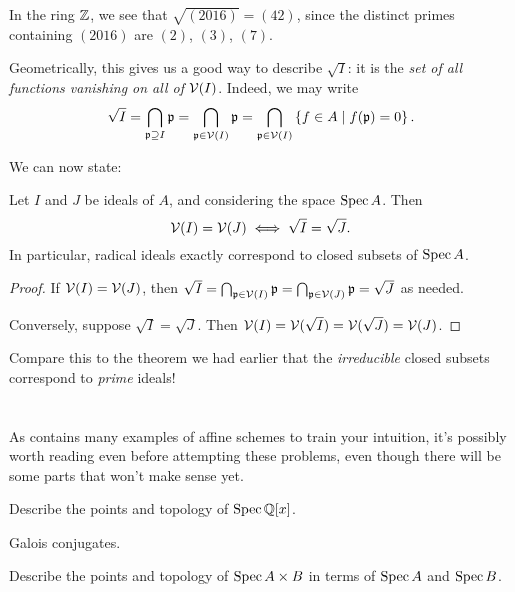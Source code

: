 \begin{example}
	[$\sqrt{(2016)} = (42)$ in $\ZZ$]
	In the ring $\ZZ$, we see that $\sqrt{(2016)} = (42)$,
	since the distinct primes containing $(2016)$
	are $(2)$, $(3)$, $(7)$.
\end{example}

Geometrically, this gives us a good way to describe $\sqrt I$:
it is the \emph{set of all functions vanishing on all of $\mathcal V(I)$}.
Indeed, we may write
\[ \sqrt I = \bigcap_{\mathfrak p \supseteq I} \mathfrak p
	= \bigcap_{\mathfrak p \in \mathcal V(I)} \mathfrak p
	= \bigcap_{\mathfrak p \in \mathcal V(I)} \left\{ f \in A \mid f(\mathfrak p) = 0 \right\}. \]

We can now state:
\begin{theorem}
	Let $I$ and $J$ be ideals of $A$,
	and considering the space $\operatorname{Spec} A$.
	Then
	\[ \mathcal V(I) = \mathcal V(J) \iff \sqrt I = \sqrt J. \]
	In particular, radical ideals exactly
	correspond to closed subsets of $\operatorname{Spec} A$.
\end{theorem}
\begin{proof}
	If $\mathcal V(I) = \mathcal V(J)$,
	then $\sqrt I = \bigcap_{\mathfrak p \in \mathcal V(I)} \mathfrak p =
	\bigcap_{\mathfrak p \in \mathcal V(J)} \mathfrak p = \sqrt J$ as needed.

	Conversely, suppose $\sqrt I = \sqrt J$.
	Then $\mathcal V(I) = \mathcal V(\sqrt I) = \mathcal V(\sqrt J) = \mathcal V(J)$.
\end{proof}

Compare this to the theorem we had earlier
that the \emph{irreducible} closed subsets correspond to \emph{prime} ideals!

\section{\problemhead}
As  contains many
examples of affine schemes to train your intuition,
it's possibly worth reading even before attempting these problems,
even though there will be some parts that won't make sense yet.

\begin{problem}
	[{$\Spec \QQ[x]$}]
	Describe the points and topology of $\Spec \QQ[x]$.
	\begin{hint}
		Galois conjugates.
	\end{hint}
\end{problem}

\begin{problem}
	Describe the points and topology of $\operatorname{Spec} A \times B$
	in terms of $\operatorname{Spec} A$ and $\operatorname{Spec} B$.
\end{problem}

